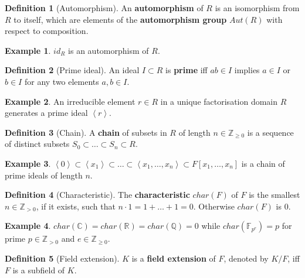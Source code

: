 \documentclass{article}
\newcommand{\F}{\mathbb{F}}
\newcommand{\Z}{\mathbb{Z}}
\newcommand{\Q}{\mathbb{Q}}
\newcommand{\R}{\mathbb{R}}
\newcommand{\C}{\mathbb{C}}
\newcommand{\rb}[1]{\left( #1 \right)}
\renewcommand{\sb}[1]{\left[ #1 \right]}
\newcommand{\ab}[1]{\left\langle #1 \right\rangle}
\theoremstyle{definition}\newtheorem*{definition}{Definition}
\theoremstyle{definition}\newtheorem*{example}{Example}
\theoremstyle{definition}\newtheorem*{remark}{Remark}
\begin{document}
\begin{definition}[Automorphism]
An \textbf{automorphism} of $ R $ is an isomorphism from $ R $ to itself, which are elements of the \textbf{automorphism group} $ Aut\rb{R} $ with respect to composition.
\end{definition}

\begin{example}
$ id_R $ is an automorphism of $ R $.
\end{example}

\begin{definition}[Prime ideal]
An ideal $ I \subset R $ is \textbf{prime} iff $ ab \in I $ implies $ a \in I $ or $ b \in I $ for any two elements $ a, b \in I $.
\end{definition}

\begin{example}
An irreducible element $ r \in R $ in a unique factorisation domain $ R $ generates a prime ideal $ \ab{r} $.
\end{example}

\begin{definition}[Chain]
A \textbf{chain} of subsets in $ R $ of length $ n \in \Z_{\ge 0} $ is a sequence of distinct subsets $ S_0 \subset \dots \subset S_n \subset R $.
\end{definition}

\begin{example}
$ \ab{0} \subset \ab{x_1} \subset \dots \subset \ab{x_1, \dots, x_n} \subset F\sb{x_1, \dots, x_n} $ is a chain of prime ideals of length $ n $.
\end{example}

\begin{definition}[Characteristic]
The \textbf{characteristic} $ char\rb{F} $ of $ F $ is the smallest $ n \in \Z_{> 0} $, if it exists, such that $ n \cdot 1 = 1 + \dots + 1 = 0 $. Otherwise $ char\rb{F} $ is $ 0 $.
\end{definition}

\begin{example}
$ char\rb{\C} = char\rb{\R} = char\rb{\Q} = 0 $ while $ char\rb{\F_{p^e}} = p $ for prime $ p \in \Z_{> 0} $ and $ e \in \Z_{\ge 0} $.
\end{example}

\begin{definition}[Field extension]
$ K $ is a \textbf{field extension} of $ F $, denoted by $ K / F $, iff $ F $ is a subfield of $ K $.
\end{definition}
\end{document}
